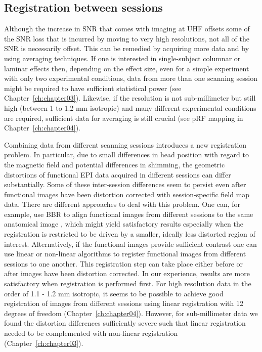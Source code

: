 \subsection{Registration between sessions}
Although the increase in SNR that comes with imaging at UHF offsets some of the SNR loss that is incurred by moving to very high resolutions, not all of the SNR is necessarily offset. This can be remedied by acquiring more data and by using averaging techniques. If one is interested in single-subject columnar or laminar effects then, depending on the effect size, even for a simple experiment with only two experimental conditions, data from more than one scanning session might be required to have sufficient statistical power (see Chapter~\ref{ch:chapter03}). Likewise, if the resolution is not sub-millimeter but still high (between 1 to 1.2 mm isotropic) and many different experimental conditions are required, sufficient data for averaging is still crucial (see pRF mapping in Chapter~\ref{ch:chapter04}).

Combining data from different scanning sessions introduces a new registration problem. In particular, due to small differences in head position with regard to the magnetic field and potential differences in shimming, the geometric distortions of functional EPI data acquired in different sessions can differ substantially. Some of these inter-session differences seem to persist even after functional images have been distortion corrected with session-specific field map data. There are different approaches to deal with this problem. One can, for example, use BBR to align functional images from different sessions to the same anatomical image \parencite{Nasr2016}, which might yield satisfactory results especially when the registration is restricted to be driven by a smaller, ideally less distorted region of interest. Alternatively, if the functional images provide sufficient contrast one can use linear \parencite{Jenkinson2001, Jenkinson2002} or non-linear algorithms \parencite{Andersson2007} to register functional images from different sessions to one another. This registration step can take place either before or after images have been distortion corrected. In our experience, results are more satisfactory when registration is performed first. For high resolution data in the order of 1.1 - 1.2 mm isotropic, it seems to be possible to achieve good registration of images from different sessions using linear registration with 12 degrees of freedom \parencite{Gulban2018b} (Chapter~\ref{ch:chapter04}). However, for sub-millimeter data we found the distortion differences sufficiently severe such that linear registration needed to be complemented with non-linear registration \parencite{Schneider2019} (Chapter~\ref{ch:chapter03}).

